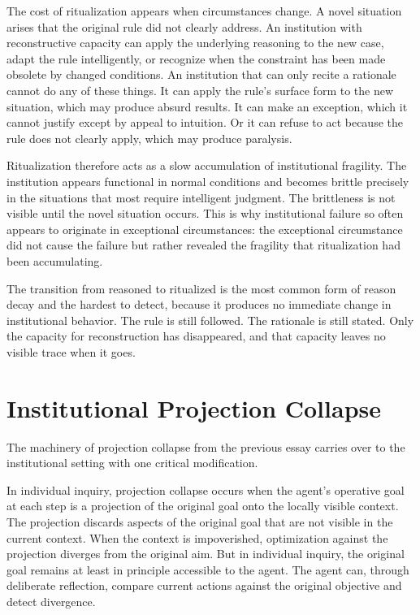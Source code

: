 The cost of ritualization appears when circumstances change. A novel situation
arises that the original rule did not clearly address. An institution with
reconstructive capacity can apply the underlying reasoning to the new case,
adapt the rule intelligently, or recognize when the constraint has been
made obsolete by changed conditions. An institution that can only recite
a rationale cannot do any of these things. It can apply the rule's surface
form to the new situation, which may produce absurd results. It can make an
exception, which it cannot justify except by appeal to intuition. Or it can
refuse to act because the rule does not clearly apply, which may produce
paralysis.

Ritualization therefore acts as a slow accumulation of institutional
fragility. The institution appears functional in normal conditions and becomes
brittle precisely in the situations that most require intelligent judgment.
The brittleness is not visible until the novel situation occurs. This is
why institutional failure so often appears to originate in exceptional
circumstances: the exceptional circumstance did not cause the failure but
rather revealed the fragility that ritualization had been accumulating.

The transition from reasoned to ritualized is the most common form of reason
decay and the hardest to detect, because it produces no immediate change in
institutional behavior. The rule is still followed. The rationale is still
stated. Only the capacity for reconstruction has disappeared, and that
capacity leaves no visible trace when it goes.

\section{Institutional Projection Collapse}

The machinery of projection collapse from the previous essay carries over
to the institutional setting with one critical modification.

In individual inquiry, projection collapse occurs when the agent's operative
goal at each step is a projection of the original goal onto the locally
visible context. The projection discards aspects of the original goal that
are not visible in the current context. When the context is impoverished,
optimization against the projection diverges from the original aim. But in
individual inquiry, the original goal remains at least in principle accessible
to the agent. The agent can, through deliberate reflection, compare current
actions against the original objective and detect divergence.

